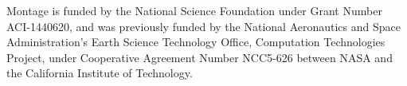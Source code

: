\documentclass[../main.tex]{subfiles}
\begin{document}
\label{sec:acknowledgements}
Montage is funded by the National Science Foundation under Grant Number ACI-1440620, and was previously funded by the National Aeronautics and Space Administration's Earth Science Technology Office, Computation Technologies Project, under Cooperative Agreement Number NCC5-626 between NASA and the California Institute of Technology.
\end{document}
